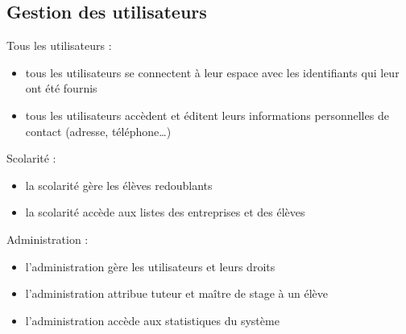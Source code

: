 \documentclass{scrreprt}
\begin{document}
\subsection{Gestion des utilisateurs}
Tous les utilisateurs :
\begin{itemize}
\item tous les utilisateurs se connectent \`a leur espace avec les identifiants qui leur ont \'et\'e fournis
\item tous les utilisateurs acc\`edent et \'editent leurs informations personnelles de contact (adresse, t\'el\'ephone…)
\end{itemize}
Scolarit\'e :
\begin{itemize}
\item la scolarit\'e g\`ere les \'el\`eves redoublants
\item la scolarit\'e acc\`ede aux listes des entreprises et des \'elèves
\end{itemize}
Administration : 
\begin{itemize}
\item l’administration g\`ere les utilisateurs et leurs droits
\item l’administration attribue tuteur et ma\^itre de stage \`a un \'el\`eve
\item l’administration acc\`ede aux statistiques du syst\`eme
\end{itemize}

\newpage
\end{document}
